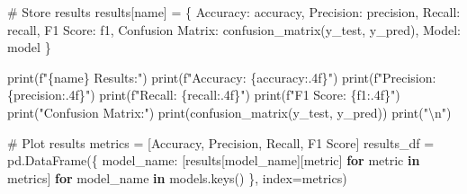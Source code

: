 \documentclass[
  12pt,
  letterpaper,
  DIV=11,
  numbers=noendperiod]{scrartcl}
\newenvironment{Shaded}{\begin{snugshade}}{\end{snugshade}}
\newcommand{\BuiltInTok}[1]{\textcolor[rgb]{0.00,0.23,0.31}{#1}}
\newcommand{\CharTok}[1]{\textcolor[rgb]{0.13,0.47,0.30}{#1}}
\newcommand{\CommentTok}[1]{\textcolor[rgb]{0.37,0.37,0.37}{#1}}
\newcommand{\ControlFlowTok}[1]{\textcolor[rgb]{0.00,0.23,0.31}{\textbf{#1}}}
\newcommand{\KeywordTok}[1]{\textcolor[rgb]{0.00,0.23,0.31}{\textbf{#1}}}
\newcommand{\NormalTok}[1]{\textcolor[rgb]{0.00,0.23,0.31}{#1}}
\newcommand{\OperatorTok}[1]{\textcolor[rgb]{0.37,0.37,0.37}{#1}}
\newcommand{\SpecialCharTok}[1]{\textcolor[rgb]{0.37,0.37,0.37}{#1}}
\newcommand{\SpecialStringTok}[1]{\textcolor[rgb]{0.13,0.47,0.30}{#1}}
\newcommand{\StringTok}[1]{\textcolor[rgb]{0.13,0.47,0.30}{#1}}
\begin{document}
\begin{Shaded}
\begin{Highlighting}[]
    \CommentTok{\# Store results}
\NormalTok{    results[name] }\OperatorTok{=}\NormalTok{ \{}
        \StringTok{\textquotesingle{}Accuracy\textquotesingle{}}\NormalTok{: accuracy,}
        \StringTok{\textquotesingle{}Precision\textquotesingle{}}\NormalTok{: precision,}
        \StringTok{\textquotesingle{}Recall\textquotesingle{}}\NormalTok{: recall,}
        \StringTok{\textquotesingle{}F1 Score\textquotesingle{}}\NormalTok{: f1,}
        \StringTok{\textquotesingle{}Confusion Matrix\textquotesingle{}}\NormalTok{: confusion\_matrix(y\_test, y\_pred),}
        \StringTok{\textquotesingle{}Model\textquotesingle{}}\NormalTok{: model}
\NormalTok{    \}}
    
    \BuiltInTok{print}\NormalTok{(}\SpecialStringTok{f"}\SpecialCharTok{\{}\NormalTok{name}\SpecialCharTok{\}}\SpecialStringTok{ Results:"}\NormalTok{)}
    \BuiltInTok{print}\NormalTok{(}\SpecialStringTok{f"Accuracy: }\SpecialCharTok{\{}\NormalTok{accuracy}\SpecialCharTok{:.4f\}}\SpecialStringTok{"}\NormalTok{)}
    \BuiltInTok{print}\NormalTok{(}\SpecialStringTok{f"Precision: }\SpecialCharTok{\{}\NormalTok{precision}\SpecialCharTok{:.4f\}}\SpecialStringTok{"}\NormalTok{)}
    \BuiltInTok{print}\NormalTok{(}\SpecialStringTok{f"Recall: }\SpecialCharTok{\{}\NormalTok{recall}\SpecialCharTok{:.4f\}}\SpecialStringTok{"}\NormalTok{)}
    \BuiltInTok{print}\NormalTok{(}\SpecialStringTok{f"F1 Score: }\SpecialCharTok{\{}\NormalTok{f1}\SpecialCharTok{:.4f\}}\SpecialStringTok{"}\NormalTok{)}
    \BuiltInTok{print}\NormalTok{(}\StringTok{"Confusion Matrix:"}\NormalTok{)}
    \BuiltInTok{print}\NormalTok{(confusion\_matrix(y\_test, y\_pred))}
    \BuiltInTok{print}\NormalTok{(}\StringTok{"}\CharTok{\textbackslash{}n}\StringTok{"}\NormalTok{)}

\CommentTok{\# Plot results}
\NormalTok{metrics }\OperatorTok{=}\NormalTok{ [}\StringTok{\textquotesingle{}Accuracy\textquotesingle{}}\NormalTok{, }\StringTok{\textquotesingle{}Precision\textquotesingle{}}\NormalTok{, }\StringTok{\textquotesingle{}Recall\textquotesingle{}}\NormalTok{, }\StringTok{\textquotesingle{}F1 Score\textquotesingle{}}\NormalTok{]}
\NormalTok{results\_df }\OperatorTok{=}\NormalTok{ pd.DataFrame(\{}
\NormalTok{    model\_name: [results[model\_name][metric] }\ControlFlowTok{for}\NormalTok{ metric }\KeywordTok{in}\NormalTok{ metrics]}
    \ControlFlowTok{for}\NormalTok{ model\_name }\KeywordTok{in}\NormalTok{ models.keys()}
\NormalTok{\}, index}\OperatorTok{=}\NormalTok{metrics)}


\end{Highlighting}
\end{Shaded}
\end{document}
